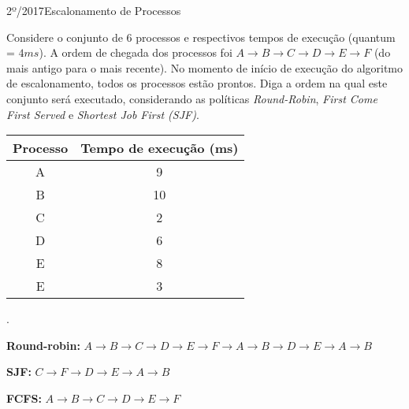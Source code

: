 \begin{exercicio}
  {2º/2017}{Escalonamento de Processos}
  {Considere o conjunto de $6$ processos e respectivos tempos de execução (quantum = $4 ms$). A ordem de chegada dos processos foi $A \rightarrow B \rightarrow C \rightarrow D \rightarrow E \rightarrow F$ (do mais antigo para o mais recente). No momento de início de execução do algoritmo de escalonamento, todos os processos estão prontos. Diga a ordem na qual este conjunto será executado, considerando as políticas \textit{Round-Robin}, \textit{First Come First Served} e \textit{Shortest Job First (SJF)}.
  \begin{table}[!H]
    \centering
    \begin{tabular}{cc}
      \hline \hline
      \textbf{Processo} & \textbf{Tempo de execução (ms)} \\ \hline
      A                 & 9                               \\
      B                 & 10                              \\
      C                 & 2                               \\
      D                 & 6                               \\
      E                 & 8                               \\
      E                 & 3                              \\ \hline \hline
    \end{tabular}
  \end{table}.}

  \textbf{Round-robin:} $A \rightarrow B \rightarrow C \rightarrow D \rightarrow E \rightarrow F \rightarrow A \rightarrow B \rightarrow D \rightarrow E \rightarrow A \rightarrow B$

  \textbf{SJF:} $C \rightarrow F \rightarrow D \rightarrow E \rightarrow A \rightarrow B$

  \textbf{FCFS:} $A \rightarrow B \rightarrow C \rightarrow D \rightarrow E \rightarrow F$

\end{exercicio}

